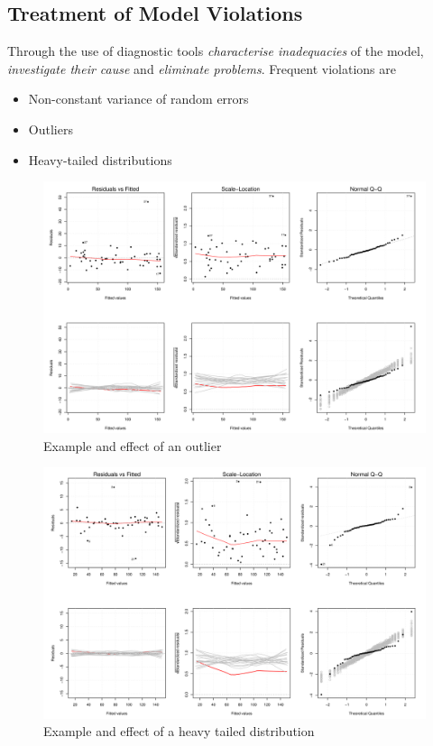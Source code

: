 \documentclass[11pt]{article}
\theoremstyle{definition}
\begin{document}
\subsection{Treatment of Model Violations}
Through the use of diagnostic tools \textit{characterise inadequacies} of the model, \textit{investigate their cause} and \textit{eliminate problems}. Frequent violations are
\begin{itemize}
	\item Non-constant variance of random errors
	\item Outliers
	\item Heavy-tailed distributions
\end{itemize}
\begin{figure}[H]
	\centering
	\includegraphics[width=0.8\linewidth]{img/outliers}
	\caption{Example and effect of an outlier}
	\label{fig:outliers}
\end{figure}

\begin{figure}[H]
	\centering
	\includegraphics[width=0.8\linewidth]{img/heavy_tailed_distribution}
	\caption{Example and effect of a heavy tailed distribution}
	\label{fig:heavytaileddistribution}
\end{figure}
\end{document}
